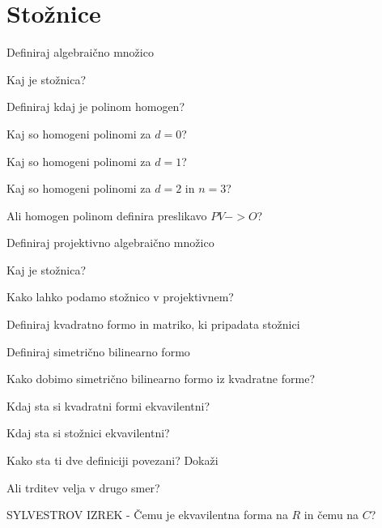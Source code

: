\documentclass{article}
\begin{document}
    \section{Stožnice}
    \begin{enumerate}
        \item Definiraj algebraično množico
        \item Kaj je stožnica?
        \item Definiraj kdaj je polinom homogen?
        \item Kaj so homogeni polinomi za $d = 0$?
        \item Kaj so homogeni polinomi za $d = 1$?
        \item Kaj so homogeni polinomi za $d = 2$ in $n=3$?
        \item Ali homogen polinom definira preslikavo $PV -> O$?
        {\color{red}\item Definiraj projektivno algebraično množico}
        \item Kaj je stožnica?
        \item Kako lahko podamo stožnico v projektivnem?
        \item Definiraj kvadratno formo in matriko, ki pripadata stožnici
        {\color{red}\item Definiraj simetrično bilinearno formo}
        \item Kako dobimo simetrično bilinearno formo iz kvadratne forme?
        
        {\color{red}\item Kdaj sta si kvadratni formi ekvavilentni?}
        {\color{red}\item Kdaj sta si stožnici ekvavilentni?}
        {\color{red}\item Kako sta ti dve definiciji povezani? Dokaži}
        \item Ali trditev velja v drugo smer?
        \item SYLVESTROV IZREK - Čemu je ekvavilentna forma na $R$ in čemu na $C$?
    \end{enumerate}
\end{document}
